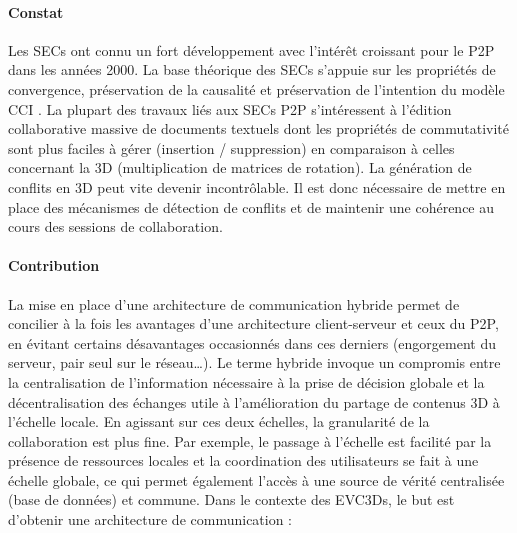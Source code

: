 \paragraph{Constat} Les \glspl{SEC} ont connu un fort développement avec 
l'intérêt 
croissant 
pour le \gls{P2P} dans les années 2000. 
La base théorique des \glspl{SEC} s'appuie sur les propriétés de 
convergence, préservation de la causalité et préservation de l'intention du modèle 
\acrshort{CCI} \cite{Sun1998}. 
La plupart des travaux liés aux \glspl{SEC} \gls{P2P} s'intéressent à 
l'édition collaborative massive de documents textuels dont les propriétés 
de commutativité sont plus faciles à gérer (insertion / suppression) en 
comparaison à celles concernant la \gls{3D} (multiplication de matrices de 
rotation). La génération de conflits en \gls{3D} peut vite devenir incontrôlable. Il est 
donc nécessaire de mettre en place des mécanismes de détection de 
conflits et de maintenir une cohérence au cours des sessions de 
collaboration. 








\paragraph{Contribution}
La mise en place d'une architecture de communication 
hybride permet de concilier à la 
fois les avantages d'une architecture client-serveur et ceux du \gls{P2P}, en évitant 
certains désavantages occasionnés dans ces derniers (engorgement du serveur, 
pair seul sur le réseau\dots). 
Le terme \og hybride\fg{} invoque un compromis entre la 
centralisation de l'information nécessaire à la prise de décision globale et 
la décentralisation des échanges utile à l'amélioration du partage de 
contenus \gls{3D} à l'échelle locale. 
En agissant sur ces deux échelles, la granularité de la collaboration est plus fine. 
Par exemple, le passage à l'échelle est facilité par la présence de 
ressources locales et la coordination des utilisateurs se fait à une échelle 
globale, ce qui permet également l'accès à une source de vérité 
centralisée (base de données) et commune.
Dans le contexte des \glspl{EVC3D}, le but 
est d'obtenir une architecture de communication : 

